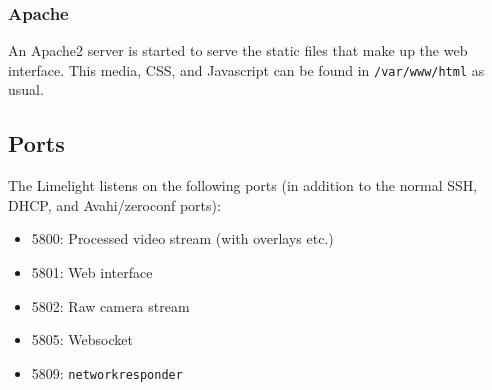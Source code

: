 \documentclass{article}
\begin{document}
\subsubsection{Apache}
\par An Apache2 server is started to serve the static files that make up the web interface. This media, CSS, and Javascript can be found in \texttt{/var/www/html} as usual. 

\subsection{Ports}
\label{sec:ports}
The Limelight listens on the following ports (in addition to the normal SSH, DHCP, and Avahi/zeroconf ports):
\begin{itemize}
\item 5800: Processed video stream (with overlays etc.)
\item 5801: Web interface
\item 5802: Raw camera stream
\item 5805: Websocket
\item 5809: \texttt{networkresponder}
\end{itemize}
\end{document}
